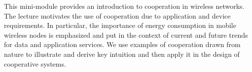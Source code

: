 This mini-module provides an introduction to cooperation in wireless networks. The lecture motivates the use of cooperation due to application and device requirements. In particular, the importance of energy consumption in mobile wireless nodes is emphasized and put in the context of current and future trends for data and application services. We use examples of cooperation drawn from nature to illustrate and derive key intuition and then apply it in the design of cooperative systems.
